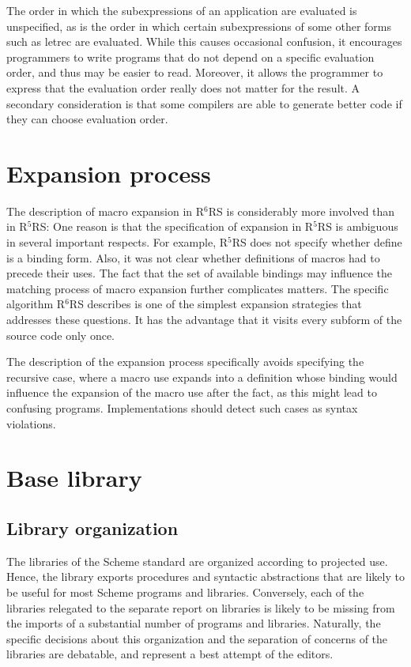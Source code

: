 \documentclass[twoside,twocolumn]{algol60}
\newcommand{\rn}[1]{R$^{#1}$RS}
\begin{document}
The order in which the subexpressions of an application are evaluated
is unspecified, as is the order in which certain subexpressions of
some other forms such as {\cf letrec} are evaluated.  While this
causes occasional confusion, it encourages programmers to write
programs that do not depend on a specific evaluation order, and thus
may be easier to read.  Moreover, it allows the programmer to express
that the evaluation order really does not matter for the result.  A
secondary consideration is that some compilers are able to generate
better code if they can choose evaluation order.


\chapter{Expansion process}

The description of macro expansion in \rn{6} is considerably more involved than
in \rn{5}: One reason is that the specification of
expansion in \rn{5} is ambiguous in several important respects.  For
example, \rn{5} does not specify whether {\cf define} is a binding
form.  Also, it was not clear whether definitions of macros had to
precede their uses.  The fact that the set of available bindings may
influence the matching process of macro expansion further complicates
matters.  The specific algorithm \rn{6} describes is one of the
simplest expansion strategies that addresses these questions.  It has
the advantage that it visits every subform of the source code only
once.

The description of the expansion process specifically avoids
specifying the recursive case, where a macro use expands into a
definition whose binding would influence the expansion of the macro
use after the fact, as this might lead to confusing programs.
Implementations should detect such cases as syntax violations.

\chapter{Base library}

\section{Library organization}

The libraries of the Scheme standard are organized according to
projected use.  Hence, the  library exports
procedures and syntactic abstractions that are likely to be useful for
most Scheme programs and libraries.  Conversely, each of the libraries
relegated to the separate report on libraries is likely to be missing
from the imports of a substantial number of programs and libraries.
Naturally, the specific decisions about this organization and the
separation of concerns of the libraries are debatable, and represent a
best attempt of the editors.
\end{document}

